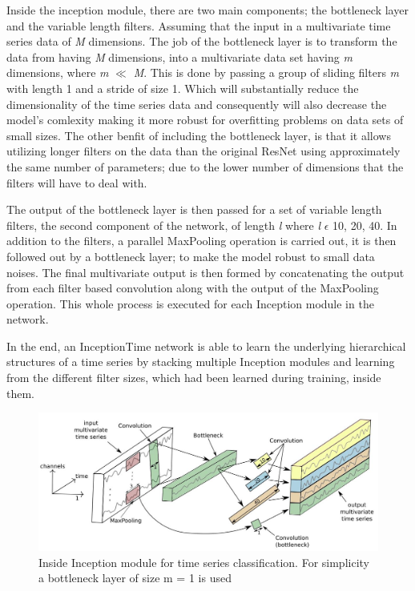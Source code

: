 Inside the inception module, there are two main components; the bottleneck layer and the variable length filters.
Assuming that the input in a multivariate time series data of \emph{M} dimensions. The job of the bottleneck layer is to transform
the data from having \emph{M} dimensions, into a multivariate data set having \emph{m} dimensions, where \emph{m} $\ll$ \emph{M}.
This is done by passing a group of sliding filters \emph{m} with length 1 and a stride of size 1.
Which will substantially reduce the dimensionality of the time series data and consequently will also decrease the model's comlexity
making it more robust for overfitting problems on data sets of small sizes. The other benfit of including the bottleneck layer,
is that it allows utilizing longer filters on the data than the original ResNet using approximately the same number of parameters;
due to the lower number of dimensions that the filters will have to deal with.

The output of the bottleneck layer is then passed for a set of variable length filters, the second component of the network, of length \emph{l}
where \emph{l} $\epsilon$ {10, 20, 40}. In addition to the filters, a parallel MaxPooling operation is carried out, it is then followed out by a bottleneck layer;
to make the model robust to small data noises. The final multivariate output is then formed by concatenating the output from each filter based convolution
along with the output of the MaxPooling operation. This whole process is executed for each Inception module in the network.

In the end, an InceptionTime network is able to learn the underlying hierarchical structures of a time series by stacking multiple Inception modules
and learning from the different filter sizes, which had been learned during training, inside them.

\begin{figure}[!htbp]
    \captionsetup{justification=raggedright}
    \centering
    \includegraphics[scale = 0.5]{InceptionTime.JPG}
    \centering
    \caption{Inside Inception module for time series classification. For simplicity a bottleneck layer of size m = 1 is used \cite{fawaz2020inceptiontime}}
    \label{Img:InceptionTime}
\end{figure}

